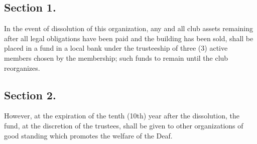 \documentclass[12pt,letterpaper]{article}
\begin{document}
\subsection*{Section 1.} In the event of dissolution of this organization, any and all club assets
remaining after all legal obligations have been paid and the building has been sold, shall
be placed in a fund in a local bank under the trusteeship of three (3) active members
chosen by the membership; such funds to remain until the club reorganizes.
\subsection*{Section 2.} However, at the expiration of the tenth (10th) year after the dissolution, the
fund, at the discretion of the trustees, shall be given to other organizations of good
standing which promotes the welfare of the Deaf.
\end{document}
